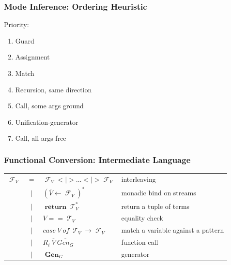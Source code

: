 \documentclass[xcolor=table, aspectratio=169]{beamer}
\DeclareMathOperator{\Term}{\mathcal{T}}
\DeclareMathOperator{\Fun}{\mathcal{F}}
\DeclareMathOperator{\Rtrn}{\mathbf{return}}
\DeclareMathOperator{\Gen}{\mathbf{Gen}}
\newcommand{\LIST}[1]{ #1^*}
\begin{document}
\begin{frame}[fragile]
  \frametitle{Mode Inference: Ordering Heuristic}
\begin{center}
Priority:
\end{center}

\vfill

\begin{center}
  \begin{minipage}{0.4\textwidth}
    \begin{enumerate}
      \item Guard
      \item Assignment
      \item Match
      \item Recursion, same direction
      \item Call, some args ground
      \item Unification-generator
      \item Call, all args free
    \end{enumerate}
  \end{minipage}
\end{center}


\end{frame}

\begin{frame}[fragile]
  \frametitle{Functional Conversion: Intermediate Language}
\begin{center}
\begin{tabular}{lcll}
    $\Fun_{V}$ & $=$ & $\Fun_{V} <|> \dots <|> \Fun_{V}$ & interleaving\\
               & $\mid$ & $\LIST{\left(\overline{V} \leftarrow \Fun_{V}\right)} $ & monadic bind on streams\\
               & $\mid$ & $\Rtrn \LIST{\Term_{V}}$ & return a tuple of terms\\
               & $\mid$ & $V == \Term_{V}$ & equality check\\
               & $\mid$ &  $case \ V \ of \ \Term_{V} \rightarrow \Fun_{V}$& match a variable against a pattern\\
               & $\mid$ & $R_i \ \overline{V} \ \overline{Gen_{G}}$ & function call\\
               & $\mid$ & $\Gen_{G}$ & generator
\end{tabular}
\end{center}
\end{frame}
\end{document}
